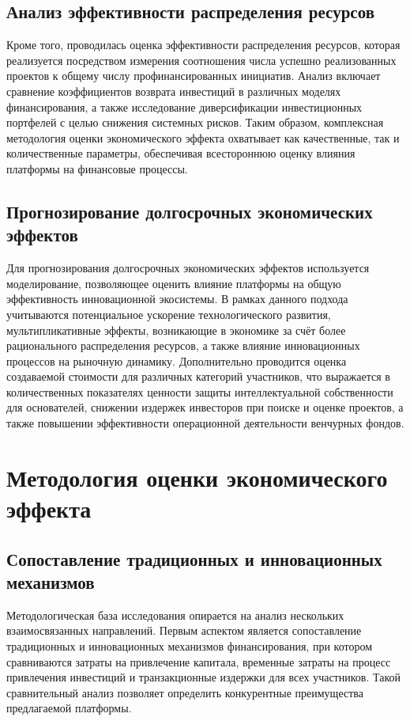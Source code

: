 \documentclass[
    candidate, %
    subf, %
    dotsinheaders=false,
]{disser}
\begin{document}
\subsection{Анализ эффективности распределения ресурсов}
Кроме того, проводилась оценка эффективности распределения ресурсов, которая реализуется посредством измерения соотношения числа успешно реализованных проектов к общему числу профинансированных инициатив. Анализ включает сравнение коэффициентов возврата инвестиций в различных моделях финансирования, а также исследование диверсификации инвестиционных портфелей с целью снижения системных рисков. Таким образом, комплексная методология оценки экономического эффекта охватывает как качественные, так и количественные параметры, обеспечивая всестороннюю оценку влияния платформы на финансовые процессы.

\subsection{Прогнозирование долгосрочных экономических эффектов}
Для прогнозирования долгосрочных экономических эффектов используется моделирование, позволяющее оценить влияние платформы на общую эффективность инновационной экосистемы. В рамках данного подхода учитываются потенциальное ускорение технологического развития, мультипликативные эффекты, возникающие в экономике за счёт более рационального распределения ресурсов, а также влияние инновационных процессов на рыночную динамику. Дополнительно проводится оценка создаваемой стоимости для различных категорий участников, что выражается в количественных показателях ценности защиты интеллектуальной собственности для основателей, снижении издержек инвесторов при поиске и оценке проектов, а также повышении эффективности операционной деятельности венчурных фондов.

\section{Методология оценки экономического эффекта}

\subsection{Сопоставление традиционных и инновационных механизмов}
Методологическая база исследования опирается на анализ нескольких взаимосвязанных направлений. Первым аспектом является сопоставление традиционных и инновационных механизмов финансирования, при котором сравниваются затраты на привлечение капитала, временные затраты на процесс привлечения инвестиций и транзакционные издержки для всех участников. Такой сравнительный анализ позволяет определить конкурентные преимущества предлагаемой платформы.
\end{document}
